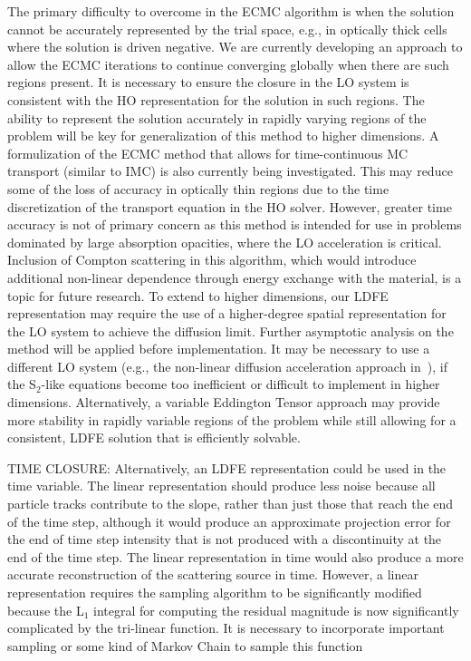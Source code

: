 The primary difficulty to overcome in the ECMC algorithm is when the solution cannot
be accurately represented by the trial space, e.g., in optically thick cells where
the solution is driven negative.   We are currently developing an approach to allow
the ECMC iterations to continue converging globally when there are such regions
present.  It is necessary to ensure the
 closure in the LO system is consistent with the HO
representation for the solution in such regions.  The ability to represent the solution accurately in
rapidly varying regions of the problem will be key for generalization of this method
to higher dimensions.  A formulization of the ECMC method
that allows for time-continuous MC transport (similar to IMC) is also currently being
investigated.  This may reduce some of the loss of accuracy in optically thin regions
due to the time discretization of the transport equation in the HO solver.
However, greater time accuracy is not of primary concern as this method is intended
for use in problems dominated by large absorption opacities, where the LO
acceleration is critical. Inclusion of Compton scattering in this algorithm, which would introduce
additional non-linear dependence through energy exchange with the
material, is a topic for future research.
  To extend
to higher dimensions, our LDFE representation may require the use of a higher-degree
spatial representation for the LO system to achieve the diffusion
limit. Further asymptotic
analysis on the method will be applied before implementation. It may be necessary to use a different LO system (e.g., the non-linear diffusion
acceleration approach in~\cite{rmc}), if the S$_2$-like equations become too
inefficient or difficult to implement in higher dimensions.  Alternatively, a
variable Eddington Tensor approach may provide more stability in rapidly variable
regions of the problem while still allowing for a consistent, LDFE solution that is efficiently solvable.

TIME CLOSURE:
Alternatively, an LDFE representation could be used in the time
variable. The linear representation should produce less noise because all particle tracks
contribute to the slope, rather than just those that reach the end of the time step,
although it would produce an approximate projection error for the end of time step
intensity that is not produced with a discontinuity at the end of the time step.  The
linear representation in time would also produce a more accurate reconstruction of the
scattering source in time.  However, a linear representation requires the sampling
algorithm to be significantly modified because the L$_1$ integral for computing the
residual magnitude is now significantly complicated by the tri-linear function.  It is
necessary to incorporate important sampling or some kind of Markov Chain to sample this
function~\cite{shultis_mc}



